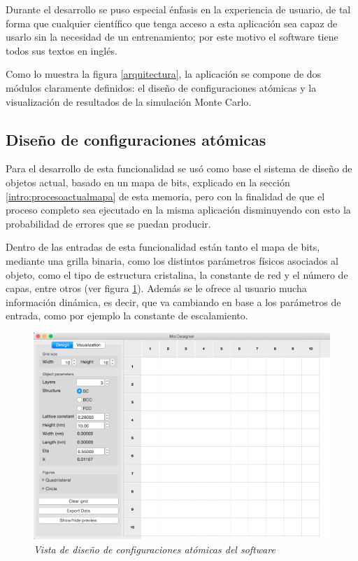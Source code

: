 Durante el desarrollo se puso especial énfasis en la experiencia de usuario, de tal forma que cualquier científico que tenga acceso a esta aplicación sea capaz de usarlo sin la necesidad de un entrenamiento; por este motivo el software tiene todos sus textos en inglés.

Como lo muestra la figura \ref{arquitectura}, la aplicación se compone de dos módulos claramente definidos: el diseño de configuraciones atómicas y la visualización de resultados de la simulación Monte Carlo.

\subsection{Diseño de configuraciones atómicas}

Para el desarrollo de esta funcionalidad se usó como base el sistema de diseño de objetos actual, basado en un mapa de bits, explicado en la sección \ref{intro:procesoactualmapa} de esta memoria, pero con la finalidad de que el proceso completo sea ejecutado en la misma aplicación disminuyendo con esto la probabilidad de errores que se puedan producir.

Dentro de las entradas de esta funcionalidad están tanto el mapa de bits, mediante una grilla binaria, como los distintos parámetros físicos asociados al objeto, como el tipo de estructura cristalina, la constante de red y el número de capas, entre otros (ver figura \ref{softwareDiseno}). Además se le ofrece al usuario mucha información dinámica, es decir, que va cambiando en base a los parámetros de entrada, como por ejemplo la constante de escalamiento.

\begin{figure}[ht]
  \centering
  \includegraphics[scale=.45]{images/softwareDiseno}
  \caption{\em Vista de diseño de configuraciones atómicas del software}
  \label{softwareDiseno}
\end{figure}

